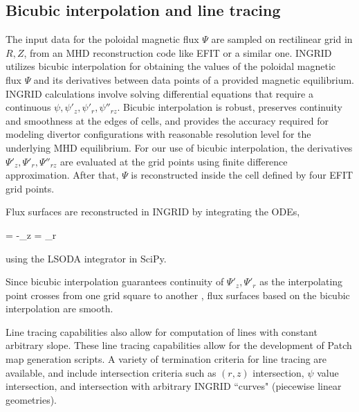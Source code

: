 \subsection{\label{sec:level2}Bicubic interpolation and line tracing}
The input data for the poloidal magnetic flux $\Psi$ are sampled on
rectilinear grid in $R,Z$, from an MHD reconstruction code like EFIT
or a similar one. INGRID utilizes bicubic interpolation for obtaining
the values of the poloidal magnetic flux $\Psi$ and its derivatives
between data points of a provided magnetic equilibrium. INGRID
calculations involve solving differential equations that require a
continuous $\psi, \psi'_{z}, \psi'_{r}, \psi''_{rz}$. Bicubic
interpolation is robust, preserves continuity and smoothness at the
edges of cells, and provides the accuracy required for modeling
divertor configurations with
reasonable resolution level for the underlying MHD equilibrium. For our use of bicubic interpolation, the
derivatives $\Psi'_{z}, \Psi'_{r}, \Psi''_{rz}$ are evaluated at the
grid points using finite difference approximation. After that, $\Psi$
is reconstructed inside the cell defined by four EFIT grid points.

Flux surfaces are reconstructed in INGRID by integrating the ODEs,

\beq
%
 = -\psi_{z} \quad {} = \psi_{r}
%
\eeq

using the LSODA integrator in SciPy.


Since bicubic interpolation guarantees continuity of $\Psi'_{z},
\Psi'_{r}$ as the interpolating point crosses from one grid square to
another \cite{Press_1992}, flux surfaces based on the bicubic
interpolation are smooth.


\noindent
Line tracing capabilities also allow for computation of lines with
constant arbitrary slope. These line tracing capabilities allow for
the development of Patch map generation scripts. A variety of
termination criteria for line tracing are available, and include
intersection criteria such as $(r,z)$ intersection, $\psi$ value
intersection, and intersection with arbitrary INGRID ``curves"
(piecewise linear geometries).
